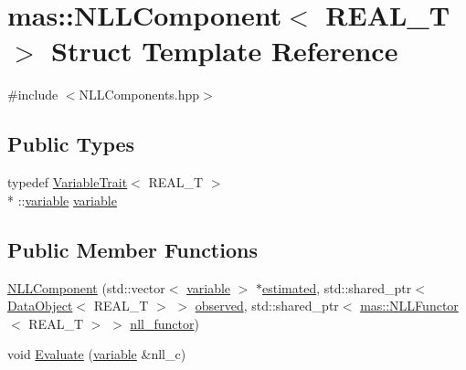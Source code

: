 \hypertarget{structmas_1_1_n_l_l_component}{\section{mas\-:\-:N\-L\-L\-Component$<$ R\-E\-A\-L\-\_\-\-T $>$ Struct Template Reference}
\label{structmas_1_1_n_l_l_component}
}


{\ttfamily \#include $<$N\-L\-L\-Components.\-hpp$>$}

\subsection*{Public Types}
\begin{DoxyCompactItemize}
\item 
typedef \hyperlink{structmas_1_1_variable_trait}{Variable\-Trait}$<$ R\-E\-A\-L\-\_\-\-T $>$\\*
\-::\hyperlink{structmas_1_1_n_l_l_component_a867afdda641b99341b7ebcbaea001f94}{variable} \hyperlink{structmas_1_1_n_l_l_component_a867afdda641b99341b7ebcbaea001f94}{variable}
\end{DoxyCompactItemize}
\subsection*{Public Member Functions}
\begin{DoxyCompactItemize}
\item 
\hyperlink{structmas_1_1_n_l_l_component_a0722b21b60ba301e910d34106fac2534}{N\-L\-L\-Component} (std\-::vector$<$ \hyperlink{structmas_1_1_n_l_l_component_a867afdda641b99341b7ebcbaea001f94}{variable} $>$ $\ast$\hyperlink{structmas_1_1_n_l_l_component_a1d5439e34e306b6d3cfabfa7511f4885}{estimated}, std\-::shared\-\_\-ptr$<$ \hyperlink{structmas_1_1_data_object}{Data\-Object}$<$ R\-E\-A\-L\-\_\-\-T $>$ $>$ \hyperlink{structmas_1_1_n_l_l_component_a82a2b4e08e4b1f9509aae06b0622bcef}{observed}, std\-::shared\-\_\-ptr$<$ \hyperlink{structmas_1_1_n_l_l_functor}{mas\-::\-N\-L\-L\-Functor}$<$ R\-E\-A\-L\-\_\-\-T $>$ $>$ \hyperlink{structmas_1_1_n_l_l_component_aac558bbcbc7a6d23b86b59bde0b2feed}{nll\-\_\-functor})
\item 
void \hyperlink{structmas_1_1_n_l_l_component_ac8865fe2326ebc453fc69d7c7d0852a5}{Evaluate} (\hyperlink{structmas_1_1_n_l_l_component_a867afdda641b99341b7ebcbaea001f94}{variable} \&nll\-\_\-c)
\end{DoxyCompactItemize}
